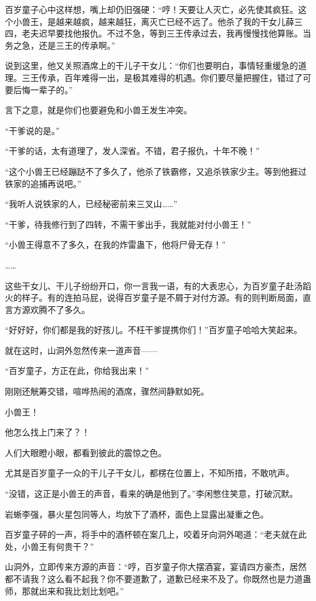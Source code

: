 \begin{this_body}
百岁童子心中这样想，嘴上却仍旧强硬：“哼！天要让人灭亡，必先使其疯狂。这个小兽王，是越来越疯，越来越狂，离灭亡已经不远了。他杀了我的干女儿薛三四，老夫迟早要找他报仇。不过不急，等到三王传承过去，我再慢慢找他算账。当务之急，还是三王的传承啊。”

说到这里，他又关照酒席上的干儿子干女儿：“你们也要明白，事情轻重缓急的道理。三王传承，百年难得一出，是极其难得的机遇。你们要尽量把握住，错过了可要后悔一辈子的。”

言下之意，就是你们也要避免和小兽王发生冲突。

“干爹说的是。”

“干爹的话，太有道理了，发人深省。不错，君子报仇，十年不晚！”

“这个小兽王已经蹦跶不了多久了，他杀了铁霸修，又追杀铁家少主。等到他捱过铁家的追捕再说吧。”

“我听人说铁家的人，已经秘密前来三叉山……”

“干爹，待我修行到了四转，不需干爹出手，我就能对付小兽王！”

“小兽王得意不了多久，在我的炸雷蛊下，他将尸骨无存！”

……

这些干女儿、干儿子纷纷开口，你一言我一语，有的大表忠心，为百岁童子赴汤蹈火的样子。有的连拍马屁，说得百岁童子是不屑于对付方源。有的则判断局面，直言方源欢腾不了多久。

“好好好，你们都是我的好孩儿。不枉干爹提携你们！”百岁童子哈哈大笑起来。

就在这时，山洞外忽然传来一道声音——

“百岁童子，方正在此，你给我出来！”

刚刚还觥筹交错，喧哗热闹的酒席，骤然间静默如死。

小兽王！

他怎么找上门来了？！

人们大眼瞪小眼，都看到彼此的震惊之色。

尤其是百岁童子一众的干儿子干女儿，都楞在位置上，不知所措，不敢吭声。

“没错，这正是小兽王的声音，看来的确是他到了。”李闲憋住笑意，打破沉默。

岩蜥李强，暴火星包同等人，均放下了酒杯，面色上显露出凝重之色。

百岁童子砰的一声，将手中的酒杯顿在案几上，咬着牙向洞外喝道：“老夫就在此处，小兽王有何贵干？”

山洞外，立即传来方源的声音：“哼，百岁童子你大摆酒宴，宴请四方豪杰，居然都不请我？这么看不起我？你不要道歉了，道歉已经来不及了。你既然也是力道蛊师，那就出来和我比划比划吧。”


\end{this_body}
